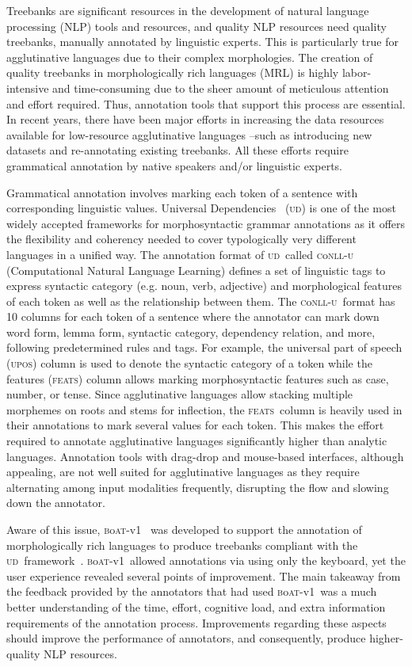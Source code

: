 \documentclass{elektr}
\newcommand{\conllu}{\textsc{c}o\textsc{nll-u}}
\newcommand{\boatvone}{\textsc{b}o\textsc{at}-{\scriptsize v1}}
\newcommand{\upos}{\textsc{upos}}
\newcommand{\feats}{\textsc{feats}}
\newcommand{\ud}{\textsc{ud}}
\begin{document}
Treebanks are significant resources in the development of natural language processing (NLP) tools and resources, and quality NLP resources need quality treebanks, manually annotated by linguistic experts.
This is particularly true for agglutinative languages due to their complex morphologies.
The creation of quality treebanks in morphologically rich languages (MRL) is highly labor-intensive and time-consuming due to the sheer amount of meticulous attention and effort required.
Thus, annotation tools that support this process are essential.
In recent years, there have been major efforts in increasing the data resources available for low-resource agglutinative languages --such as introducing new datasets and re-annotating existing treebanks.
All these efforts require grammatical annotation by native speakers and/or linguistic experts.

Grammatical annotation involves marking each token of a sentence with corresponding linguistic values.
Universal Dependencies~\cite{ud} (\ud) is one of the most widely accepted frameworks for morphosyntactic grammar annotations as it offers the flexibility and coherency needed to cover typologically very different languages in a unified way.
The annotation format of \ud\ called \conllu~\cite{conll} (Computational Natural Language Learning) defines a set of linguistic tags to express syntactic category (e.g. noun, verb, adjective) and morphological features of each token as well as the relationship between them.
The \conllu\ format has 10 columns for each token of a sentence where the annotator can mark down word form, lemma form, syntactic category, dependency relation, and more, following predetermined rules and tags.
For example, the universal part of speech (\upos) column is used to denote the syntactic category of a token while the features (\feats) column allows marking morphosyntactic features such as case, number, or tense.
Since agglutinative languages allow stacking multiple morphemes on roots and stems for inflection, the \feats\ column is heavily used in their annotations to mark several values for each token.
This makes the effort required to annotate agglutinative languages significantly higher than analytic languages.
Annotation tools with drag-drop and mouse-based interfaces, although appealing, are not well suited for agglutinative languages as they require alternating among input modalities frequently, disrupting the flow and slowing down the annotator.

Aware of this issue, \boatvone~\cite{anon} was developed to support the annotation of morphologically rich languages to produce treebanks compliant with the \ud\ framework~\cite{ud}.
\boatvone\ allowed annotations via using only the keyboard, yet the user experience revealed several points of improvement.
The main takeaway from the feedback provided by the annotators that had used \boatvone\ was a much better understanding of the time, effort, cognitive load, and extra information requirements of the annotation process.
Improvements regarding these aspects should improve the performance of annotators, and consequently, produce higher-quality NLP resources.
\end{document}
